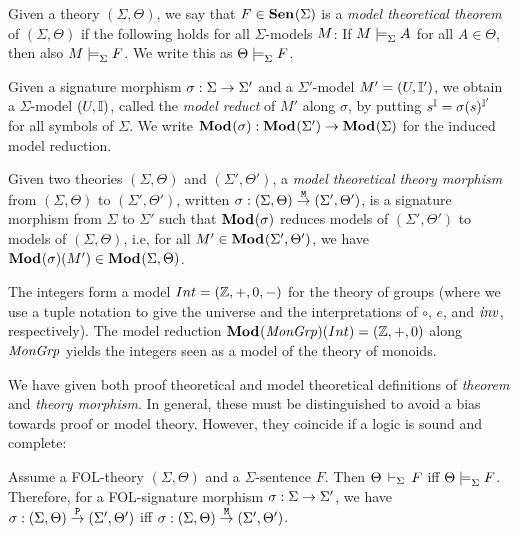 \documentclass{article}
\begin{document}
\begin{definition}
Given a theory $(\Sigma,\Theta)$, we say that $F\in{\mathbf{Sen}^{}}(\Sigma)$ is a \emph{model theoretical theorem} of $(\Sigma,\Theta)$ if the following holds for all $\Sigma$-models $M$: If $M\models^{}_{\Sigma}A$ for all $A\in\Theta$, then also $M\models^{}_{\Sigma}F$. We write this as $\Theta\models^{}_{\Sigma}F$.
\end{definition}

\begin{definition}
Given a signature morphism $\sigma:\Sigma\rightarrow\Sigma'$ and a $\Sigma'$-model $M'=(U,\mathbb{I}')$, we obtain a $\Sigma$-model $(U,\mathbb{I})$, called the \emph{model reduct} of $M'$ along $\sigma$, by putting $s^{\mathbb{I}}=\sigma(s)^{\mathbb{I}'}$ for all symbols of $\Sigma$. We write ${\mathbf{Mod}^{}}(\sigma):{\mathbf{Mod}^{}}(\Sigma')\rightarrow{\mathbf{Mod}^{}}(\Sigma)$ for the induced model reduction.
\end{definition}

\begin{definition}
Given two theories $(\Sigma,\Theta)$ and $(\Sigma',\Theta')$, a \emph{model theoretical theory morphism} from $(\Sigma,\Theta)$ to $(\Sigma',\Theta')$, written  $\sigma:(\Sigma,\Theta)\stackrel{\mathtt{M}}{\rightarrow}(\Sigma',\Theta')$, is a signature morphism from $\Sigma$ to $\Sigma'$ such that ${\mathbf{Mod}^{}}(\sigma)$ reduces models of $(\Sigma',\Theta')$ to models of $(\Sigma,\Theta)$, i.e, for all $M'\in {\mathbf{Mod}^{}}(\Sigma',\Theta')$, we have ${\mathbf{Mod}^{}}(\sigma)(M')\in{\mathbf{Mod}^{}}(\Sigma,\Theta)$.
\end{definition}


\begin{example}[Continued]\label{ex:monmod}
The integers form a model $Int=(\mathbb{Z},+,0,-)$ for the theory of groups (where we use a tuple notation to give the universe and the interpretations of $\circ$, $e$, and $\mathit{inv}$, respectively). The model reduction\linebreak
 ${\mathbf{Mod}^{}}(\mathit{MonGrp})(Int)=(\mathbb{Z},+,0)$ along $\mathit{MonGrp}$ yields the integers seen as a model of the theory of monoids.
\end{example}

We have given both proof theoretical and model theoretical definitions of \emph{theorem} and \emph{theory morphism}. In general, these must be distinguished to avoid a bias towards proof or model theory. However, they coincide if a logic is sound and complete:

\begin{theorem}
Assume a FOL-theory $(\Sigma,\Theta)$ and a $\Sigma$-sentence $F$. Then $\Theta\,\vdash_{\Sigma}\,F$ iff $\Theta\models^{}_{\Sigma}F$. Therefore, for a FOL-signature morphism $\sigma:\Sigma\rightarrow\Sigma'$, we have $\sigma:(\Sigma,\Theta)\stackrel{\mathtt{P}}{\rightarrow}(\Sigma',\Theta')$ iff $\sigma:(\Sigma,\Theta)\stackrel{\mathtt{M}}{\rightarrow}(\Sigma',\Theta')$.
\end{theorem}
\end{document}
